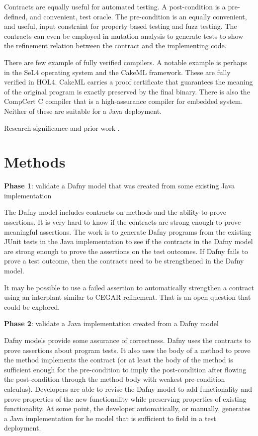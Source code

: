 \documentclass[11pt,onecolumn,notitlepage]{article}
\begin{document}
Contracts are equally useful for automated testing. A post-condition is a pre-defined, and convenient, test oracle. The pre-condition is an equally convenient, and useful, input constraint for property based testing and fuzz testing. The contracts can even be employed in mutation analysis to generate tests to show the refinement relation between the contract and the implementing code. 

There are few example of fully verified compilers. A notable example is perhaps in the SeL4 operating system and the CakeML framework. These are fully verified in HOL4. CakeML carries a proof certificate that guarantees the meaning of the original program is exactly preserved by the final binary. There is also the CompCert C compiler that is a high-assurance compiler for embedded system. Neither of these are suitable for a Java deployment.

Research significance and prior work \cite{8972014}.

\section*{Methods}

\noindent\textbf{Phase 1}: validate a Dafny model that was created from some existing Java implementation

The Dafny model includes contracts on methods and the ability to prove assertions. It is very hard to know if the contracts are strong enough to prove meaningful assertions. The work is to generate Dafny programs from the existing JUnit tests in the Java implementation to see if the contracts in the Dafny model are strong enough to prove the assertions on the test outcomes. If Dafny fails to prove a test outcome, then the contracts need to be strengthened in the Dafny model. 

It may be possible to use a failed assertion to automatically strengthen a contract using an interplant similar to CEGAR refinement. That is an open question that could be explored.

\noindent\textbf{Phase 2}: validate a Java implementation created from a Dafny model

Dafny models provide some assurance of correctness. Dafny uses the contracts to prove assertions about program tests. It also uses the body of a method to prove the method implements the contract (or at least the body of the method is sufficient enough for the pre-condition to imply the post-condition after flowing the post-condition through the method body with weakest pre-condition calculus). Developers are able to revise the Dafny model to add functionality and prove properties of the new functionality while preserving properties of existing functionality. At some point, the developer automatically, or manually, generates a Java implementation for he model that is sufficient to field in a test deployment. 
\end{document}
